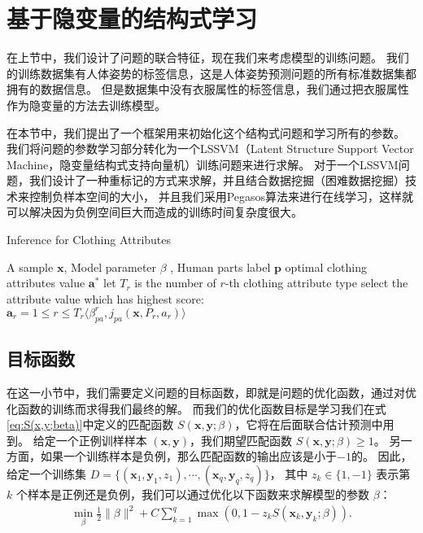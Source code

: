 \section{基于隐变量的结构式学习}
在上节中，我们设计了问题的联合特征，现在我们来考虑模型的训练问题。
我们的训练数据集有人体姿势的标签信息，这是人体姿势预测问题的所有标准数据集都拥有的数据信息。
但是数据集中没有衣服属性的标签信息，我们通过把衣服属性作为隐变量的方法去训练模型。

在本节中，我们提出了一个框架用来初始化这个结构式问题和学习所有的参数。
我们将问题的参数学习部分转化为一个LSSVM（Latent Structure Support Vector Machine，隐变量结构式支持向量机）训练问题来进行求解。
对于一个LSSVM问题，我们设计了一种重标记的方式来求解，并且结合数据挖掘（困难数据挖掘）技术来控制负样本空间的大小，
并且我们采用Pegasos\cite{pegasos}算法来进行在线学习，这样就可以解决因为负例空间巨大而造成的训练时间复杂度很大。

\begin{algorithm}
\caption{Inference for Clothing Attributes}
\begin{algorithmic}[1]
    \REQUIRE A sample $\mathbf{x}$, Model parameter $\beta$ , Human parts label $\mathbf{p}$
    \ENSURE optimal clothing attributes value $\mathbf{a^*}$
    \STATE let $T_r$ is the number of $r$-th clothing attribute type
        \STATE select the attribute value which has highest score:\\
            $\mathbf{a}_r = {1 \leq r \leq T_r} \langle \beta_{pa}^r, j_{pa}(\mathbf{x}, P_r, a_r) \rangle $
    \ENDFOR
\end{algorithmic}
\label{alg:attr}
\end{algorithm}


\subsection{目标函数}
在这一小节中，我们需要定义问题的目标函数，即就是问题的优化函数，通过对优化函数的训练而求得我们最终的解。
而我们的优化函数目标是学习我们在式\eqref{eq:S(x,y;beta)}中定义的匹配函数 $S(\mathbf{x}, \mathbf{y}; \beta)$，它将在后面联合估计预测中用到。
给定一个正例训样样本 $(\mathbf{x}, \mathbf{y})$，我们期望匹配函数 $S(\mathbf{x}, \mathbf{y}; \beta) \geq 1$。
另一方面，如果一个训练样本是负例，那么匹配函数的输出应该是小于$-1$的。
因此，给定一个训练集 $D = \{ (\mathbf{x}_1, \mathbf{y}_1, z_1), \cdots, (\mathbf{x}_q, \mathbf{y}_q, z_q) \}$， 其中 $z_k \in \{1, -1\}$ 表示第 $k$ 个样本是正例还是负例，我们可以通过优化以下函数来求解模型的参数 $\beta$：
\begin{equation}
\begin{split}
\min_{\beta}  \frac{1}{2} \|\beta\|^2 + C \sum_{k=1}^{q}\max(0, 1 - z_k S(\mathbf{x}_k, \mathbf{y}_k; \beta)).
    \label{eq:latent}
\end{split}
\end{equation}

